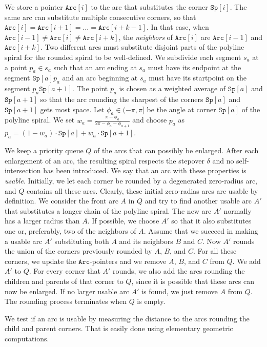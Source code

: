 \documentclass[3p]{elsarticle}
\newcommand{\stepover}{\delta}
\newcommand{\spiral}{\texttt{Sp}}
\newcommand{\arc}{\texttt{Arc}}
\begin{document}
We store a pointer $\arc[i]$ to the arc that substitutes the corner $\spiral[i]$.
The same arc can substitute multiple consecutive corners, so that
$\arc[i]=\arc[i+1]=\ldots =\arc[i+k-1]$.
In that case, when $\arc[i-1]\neq\arc[i]\neq\arc[i+k]$,
the \emph{neighbors} of $\arc[i]$ are $\arc[i-1]$ and $\arc[i+k]$.
Two different arcs must substitute disjoint parts of the polyline spiral
for the rounded spiral to be well-defined. We subdivide each segment
$s_a$ at a point $p_a\in s_a$ such that an arc ending at
$s_a$ must have its endpoint at the segment $\spiral[a]p_a$ and an arc
beginning at $s_a$ must have its startpoint on the segment
$p_a\spiral[a+1]$. The point $p_a$ is chosen as a weighted average of $\spiral[a]$ and
$\spiral[a+1]$ so that the arc rounding the sharpest of the corners $\spiral[a]$ and $\spiral[a+1]$
gets most space. Let $\phi_a\in(-\pi,\pi]$ be the angle at corner $\spiral[a]$ of the polyline spiral.
We set $w_a=\frac{\pi-\phi_a}{2\pi-\phi_a-\phi_{a+1}}$ and choose $p_a$ as
$p_a=(1-w_a)\cdot \spiral[a] + w_a\cdot \spiral[a+1]$.

We keep a priority queue $Q$ \cite{cormen2009} of the arcs that can possibly be
enlarged.
After each enlargement of an arc, the resulting spiral respects the stepover $\stepover$
and no self-intersection has been introduced. We say that an arc with these properties is
\emph{usable}.
Initially, we let each corner be rounded by a
degenerated zero-radius arc, and $Q$ contains all these arcs.
Clearly, these initial zero-radias arcs are usable by definition.
We consider the front arc $A$ in $Q$ and try to find another usable arc $A'$
that substitutes a longer chain of the polyline spiral.
The new arc $A'$ normally has a larger radius than $A$.
If possible, we choose $A'$ so that it also
substitutes one or, preferably, two of the neighbors of $A$. Assume that we succeed
in making a usable arc $A'$ substituting both $A$ and its neighbors $B$ and $C$.
Now $A'$ rounds the union of the corners previously rounded by $A$, $B$, and $C$.
For all these corners, we update the $\arc$-pointers
and we remove $A$, $B$, and $C$ from $Q$.
We add $A'$ to $Q$. For every corner that $A'$ rounds,
we also add the arcs rounding the children and parents of that corner to $Q$,
since it is possible that these arcs can now be enlarged.
If no larger usable arc $A'$ is found, we just remove $A$ from $Q$.
The rounding process terminates when $Q$ is empty.

We test if an arc is usable by measuring the distance to the arcs
rounding the child and parent corners. That is easily done using elementary
geometric computations.
\end{document}
